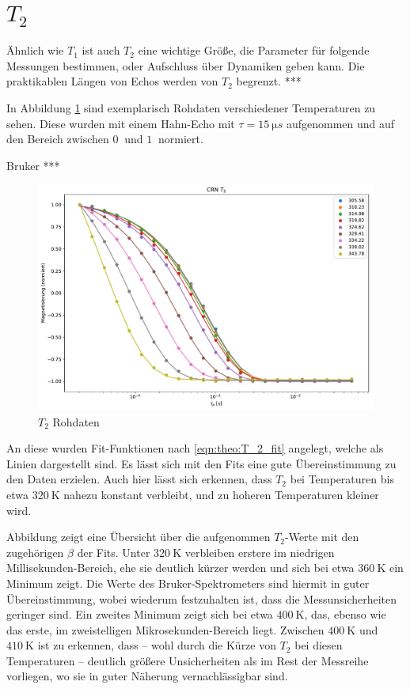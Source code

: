 \section{$T_2$} \label{section:res:T_2}

Ähnlich wie $T_1$ ist auch $T_2$ eine wichtige Größe, die Parameter für folgende Messungen bestimmen, oder Aufschluss über Dynamiken geben kann. Die praktikablen Längen von Echos werden von $T_2$ begrenzt. ***

In Abbildung \ref{fig:res:T_2_roh} sind exemplarisch Rohdaten verschiedener Temperaturen zu sehen. Diese wurden mit einem Hahn-Echo mit $\tau = \SI{15}{\micro s}$ aufgenommen und auf den Bereich zwischen $\SI{0}{}$ und $\SI{1}{}$ normiert.

Bruker *** 

\begin{figure}
	\begin{center}
		\includegraphics[width=\textwidth]{graphics/plots/T2/t2_roh.pdf}
	\end{center}
	\caption{$T_2$ Rohdaten} \label{fig:res:T_2_roh}
\end{figure}

An diese wurden Fit-Funktionen nach \eqref{eqn:theo:T_2_fit} angelegt, welche als Linien dargestellt sind. Es lässt sich mit den Fits eine gute Übereinstimmung zu den Daten erzielen. Auch hier lässt sich erkennen, dass $T_2$ bei Temperaturen bis etwa $\SI{320}{\kelvin}$ nahezu konstant verbleibt, und zu hoheren Temperaturen kleiner wird.

Abbildung \label{fig:res:T_2} zeigt eine Übersicht über die aufgenommen $T_2$-Werte mit den zugehörigen $\beta$ der Fits. Unter $\SI{320}{\kelvin}$ verbleiben erstere im niedrigen Millisekunden-Bereich, ehe sie deutlich kürzer werden und sich bei etwa $\SI{360}{\kelvin}$ ein Minimum zeigt. Die Werte des Bruker-Spektrometers sind hiermit in guter Übereinstimmung, wobei wiederum festzuhalten ist, dass die Messunsicherheiten geringer sind. Ein zweites Minimum zeigt sich bei etwa $\SI{400}{\kelvin}$, das, ebenso wie das erste, im zweistelligen Mikrosekunden-Bereich liegt. Zwischen $\SI{400}{\kelvin}$ und $\SI{410}{\kelvin}$ ist zu erkennen, dass -- wohl durch die Kürze von $T_2$ bei diesen Temperaturen -- deutlich größere Unsicherheiten als im Rest der Messreihe vorliegen, wo sie in guter Näherung vernachlässigbar sind. 

